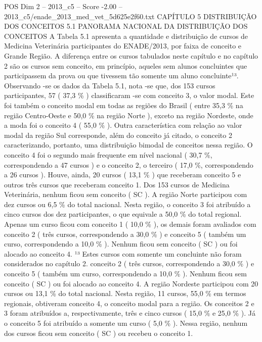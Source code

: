 \begin{textsample}{POS Dim 2 – 2013\_c5 – Score -2.00 – 2013\_c5/enade\_2013\_med\_vet\_5d625e2f60.txt}  \label{ex:f2_pos_369}
CAPÍTULO 5 DISTRIBUIÇÃO DOS CONCEITOS 5.1 PANORAMA NACIONAL DA DISTRIBUIÇÃO DOS CONCEITOS A Tabela 5.1 apresenta a quantidade e distribuição de cursos de Medicina Veterinária participantes do ENADE/2013, por faixa de conceito e Grande Região.
A diferença entre os cursos tabulados neste capítulo e no capítulo 2 são os cursos sem conceito, em princípio, aqueles sem alunos concluintes que participassem da prova ou que tivessem tão somente um aluno concluinte¹³.
Observando -se os dados da Tabela 5.1, nota -se que, dos 153 cursos participantes, 57 ( 37,3 \% ) classificaram -se com conceito 3, o valor modal.
Este foi também o conceito modal em todas as regiões do Brasil ( entre 35,3 \% na região Centro-Oeste e 50,0 \% na região Norte ), exceto na região Nordeste, onde a moda foi o conceito 4 ( 55,0 \% ).
Outra característica com relação ao valor modal da região Sul corresponde, além do conceito já citado, o conceito 2 caracterizando, portanto, uma distribuição bimodal de conceitos nessa região.
O conceito 4 foi o segundo mais frequente em nível nacional ( 30,7 \%, correspondendo a 47 cursos ) e o conceito 2, o terceiro ( 17,0 \%, correspondendo a 26 cursos ).
Houve, ainda, 20 cursos ( 13,1 \% ) que receberam conceito 5 e outros três cursos que receberam conceito 1.
Dos 153 cursos de Medicina Veterinária, nenhum ficou sem conceito ( SC ).
A região Norte participou com dez cursos ou 6,5 \% do total nacional.
Nesta região, o conceito 3 foi atribuído a cinco cursos dos dez participantes, o que equivale a 50,0 \% do total regional.
Apenas um curso ficou com conceito 1 ( 10,0 \% ), os demais foram avaliados com conceito 2 ( três cursos, correspondendo a 30,0 \% ) e conceito 5 ( também um curso, correspondendo a 10,0 \% ).
Nenhum ficou sem conceito ( SC ) ou foi alocado ao conceito 4. ¹³ Estes cursos com somente um concluinte não foram considerados no capítulo 2. conceito 2 ( três cursos, correspondendo a 30,0 \% ) e conceito 5 ( também um curso, correspondendo a 10,0 \% ).
Nenhum ficou sem conceito ( SC ) ou foi alocado ao conceito 4.
A região Nordeste participou com 20 cursos ou 13,1 \% do total nacional.
Nesta região, 11 cursos, 55,0 \% em termos regionais, obtiveram conceito 4, o conceito modal para a região.
Os conceitos 2 e 3 foram atribuídos a, respectivamente, três e cinco cursos ( 15,0 \% e 25,0 \% ).
Já o conceito 5 foi atribuído a somente um curso ( 5,0 \% ).
Nessa região, nenhum dos cursos ficou sem conceito ( SC ) ou recebeu o conceito 1.

\end{textsample}
